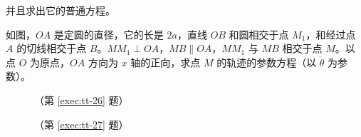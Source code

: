\begin{question}[resume]
  并且求出它的普通方程。
  \item \label{exec:tt-27}如图，$OA$ 是定圆的直径，它的长是 $2a$，直线 $OB$ 和圆相交于点 $M_1$，和经过点 $A$ 的切线相交于点 $B$。$MM_1\perp OA$，$MB\parallel OA$，$MM_1$ 与 $MB$ 相交于点 $M$。以点 $O$ 为原点，$OA$ 方向为 $x$ 轴的正向，求点 $M$ 的轨迹的参数方程（以 $\dot{\theta}$ 为参数）。
  \begin{figure}
    \begin{minipage}[b]{0.48\linewidth}\centering
      \caption*{（第 \ref{exec:tt-26} 题）}
    \end{minipage}
    \begin{minipage}[b]{0.48\linewidth}\centering
      \caption*{（第 \ref{exec:tt-27} 题）}
    \end{minipage}
  \end{figure}
\end{question}